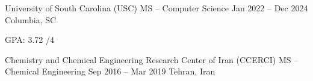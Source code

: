 {}


\begin{cventries}


\cventry
  {University of South Carolina (USC)}   %
  {MS -- Computer Science}       %
  {Jan 2022 -- Dec 2024}                      %
  {Columbia, SC}                                   %
  {
    \begin{cvitems}                           %
      \item {GPA: 3.72 /4}
    \end{cvitems}
  }

\vspace{0.05cm}
\cventry
  {Chemistry and Chemical Engineering Research Center of Iran (CCERCI)}
  {MS -- Chemical Engineering}
  {Sep 2016 -- Mar 2019}
  {Tehran, Iran}
  {
  }


\end{cventries}
